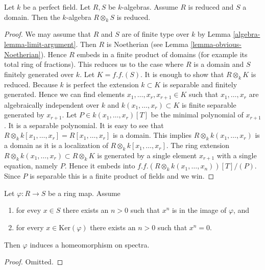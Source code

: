 \begin{lemma}
\label{lemma-perfect-reduced}
Let $k$ be a perfect field. Let $R, S$ be $k$-algebras.
Assume $R$ is reduced and $S$ a domain.
Then the $k$-algebra $R \otimes_k S$ is reduced.
\end{lemma}

\begin{proof}
We may assume that $R$ and $S$ are of finite type over $k$
by Lemma \ref{algebra-lemma-limit-argument}.
Then $R$ is Noetherian (see Lemma \ref{lemma-obvious-Noetherian}).
Hence $R$ embeds in a finite product of domains
(for example its total ring of fractions).
This reduces us to the case where $R$ is a domain
and $S$ finitely generated over $k$.
Let $K = f.f.(S)$. It is enough to show that $R \otimes_k K$
is reduced. Because $k$ is perfect the extension
$k \subset K$ is separable and finitely generated.
Hence we can find elements $x_1, \ldots, x_r, x_{r + 1} \in K$ such that
$x_1, \ldots, x_r$ are algebraically independent over
$k$ and $k(x_1, \ldots, x_r) \subset K$ is finite separable
generated by $x_{r + 1}$. Let $P \in k(x_1, \ldots, x_r)[T]$
be the minimal polynomial of $x_{r + 1}$. It is a separable polynomial.
It is easy to see that
$R \otimes_k k[x_1, \ldots, x_r] = R[x_1, \ldots, x_r]$ is a domain.
This implies $R \otimes_k k(x_1, \ldots, x_r)$ is a domain
as it is a localization of $R \otimes_k k[x_1, \ldots, x_r]$.
The ring extension $R \otimes_k k(x_1, \ldots, x_r) \subset R \otimes_k K$
is generated by a single element $x_{r + 1}$ with a single
equation, namely $P$. Hence it embeds into
$f.f.(R \otimes_k k(x_1, \ldots, x_n))[T]/(P)$.
Since $P$ is separable this is a finite product of fields and we win.
\end{proof}

\begin{lemma}
\label{lemma-p-ring-map}
Let $\varphi : R \to S$ be a ring map. Assume
\begin{enumerate}
\item for evey $x \in S$ there exists an $n > 0$ such that
$x^n$ is in the image of $\varphi$, and
\item for every $x \in \text{Ker}(\varphi)$ there exists
an $n > 0$ such that $x^n = 0$.
\end{enumerate}
Then $\varphi$ induces a homeomorphism on spectra.
\end{lemma}

\begin{proof}
Omitted.
\end{proof}

